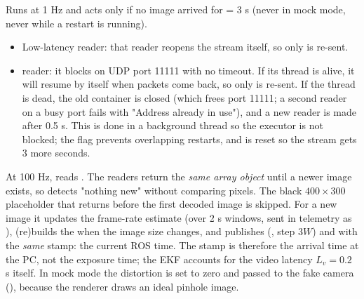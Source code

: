 Runs at 1 Hz and acts only if no image arrived for  = 3 s (never in mock mode, never while a
restart is running).
\begin{itemize}[itemsep=1pt]
\item Low-latency reader: that reader reopens the stream itself, so only  is re-sent.
\item {} reader: it blocks on UDP port 11111 with no timeout. If its thread is alive, it will resume
by itself when packets come back, so only  is re-sent. If the thread is dead, the old container is
closed (which frees port 11111; a second reader on a busy port fails with "Address already in use"), and a new
reader is made after 0.5 s. This is done in a background thread so the executor is not blocked; the flag
 prevents overlapping restarts, and  is reset so the stream gets 3 more seconds.
\end{itemize}

At 100 Hz, reads . The readers return the \emph{same array object} until a newer image exists,
so  detects "nothing new" without comparing pixels. The black $400\times300$
placeholder that  returns before the first decoded image is skipped. For a new image it updates
the frame-rate estimate (over 2 s windows, sent in telemetry as ), (re)builds the
 when the image size changes, and publishes  (, step $3W$) and
 with the \emph{same} stamp: the current ROS time. The stamp is therefore the arrival time at
the PC, not the exposure time; the EKF accounts for the video latency $L_v=0.2$ s itself. In mock mode the
distortion is set to zero and passed to the fake camera (), because the renderer draws an
ideal pinhole image.

